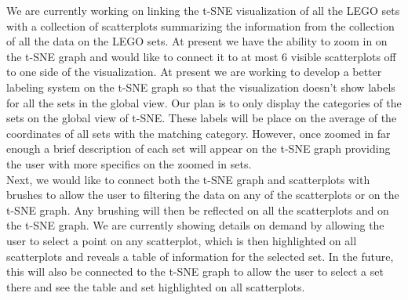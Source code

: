 \documentclass[a4paper, 11pt]{article}
\begin{document}
We are currently working on linking the t-SNE visualization of all the LEGO sets with a collection of scatterplots summarizing the information from the collection of all the data on the LEGO sets. At present we have the ability to zoom in on the t-SNE graph and would like to connect it to at most 6 visible scatterplots off to one side of the visualization. At present we are working to develop a better labeling system on  the t-SNE graph so that the visualization doesn't show labels for all the sets in the global view. Our plan is to only display the categories of the sets on the global view of t-SNE. These labels  will be place on the average of the coordinates of all sets with the matching category. 
However, once zoomed in far enough a brief description of each set will appear on the t-SNE graph providing the user with more specifics on the zoomed in sets.  \\

Next, we would like to connect both the t-SNE graph and scatterplots with brushes to allow the user to filtering the data on any of the scatterplots or on the t-SNE graph. Any brushing will then be reflected on all the scatterplots and on the t-SNE graph. 
 We are currently showing details on demand by allowing the user to select a point on any scatterplot, which is then highlighted on all scatterplots and reveals a table of information for the selected set. In the future, this will also be connected to the t-SNE graph to allow the user to select a set there and see the table and set highlighted on all scatterplots.
\end{document}
